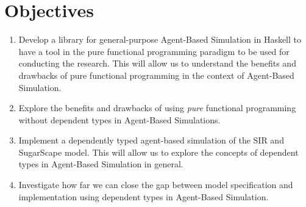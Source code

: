 \section{Objectives}
\begin{enumerate}
	\item Develop a library for general-purpose Agent-Based Simulation in Haskell to have a tool in the pure functional programming paradigm to be used for conducting the research. This will allow us to understand the benefits and drawbacks of pure functional programming in the context of Agent-Based Simulation.

	\item Explore the benefits and drawbacks of using \textit{pure} functional programming without dependent types in Agent-Based Simulations.

	\item Implement a dependently typed agent-based simulation of the SIR and SugarScape model. This will allow us to explore the concepts of dependent types in Agent-Based Simulation in general.
	


	\item Investigate how far we can close the gap between model specification and implementation using dependent types in Agent-Based Simulation. %
\end{enumerate}